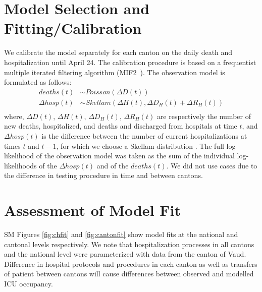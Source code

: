 \section{Model Selection and Fitting/Calibration}

We calibrate the model separately for each canton on the daily death and hospitalization until April 24. The calibration procedure is based on a frequentist multiple iterated filtering algorithm (MIF2~\cite{ionides_inference_2006}). The observation model is formulated as follows:
$$
\begin{aligned}
deaths(t) &\sim Poisson(\Delta D(t)) \\
\Delta hosp(t) &\sim Skellam(\Delta H(t), \Delta D_H(t) + \Delta R_H(t)) \\
\end{aligned}
$$
\noindent where, $\Delta D(t)$, $\Delta H(t)$, $\Delta D_H(t)$, $\Delta R_H(t)$ are respectively the number of new deaths, hospitalized, and deaths and discharged from hospitals at time $t$, and $\Delta hosp(t)$ is the difference between the number of current hospitalizations at times $t$ and $t-1$, for which we choose a Skellam distribution \cite{skellam_frequency_1946}. The full log-likelihood of the observation model was taken as the sum of the individual log-likelihoods of the $\Delta hosp(t)$ and of the $deaths(t)$. We did not use cases due to the difference in testing procedure in time and between cantons.

\section{Assessment of Model Fit}
SM Figures \ref{fig:chfit} and \ref{fig:cantonfit} show model fits at the national and cantonal levels respectively. We note that hospitalization processes in all cantons and the national level were parameterized with data from the canton of Vaud. Difference in hospital protocols and procedures in each canton as well as transfers of patient between cantons will cause differences between observed and modelled ICU occupancy. 

